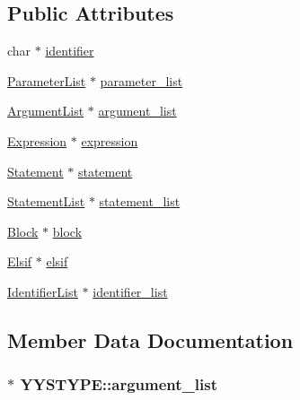 \subsection*{Public Attributes}
\begin{DoxyCompactItemize}
\item 
char $\ast$ \hyperlink{union_y_y_s_t_y_p_e_a90664571e9d5d6cabe4c478b7282b49a}{identifier}
\item 
\hyperlink{crowbar_8h_a7e7687e26b28e339ebcc8eaab571dcf7}{Parameter\+List} $\ast$ \hyperlink{union_y_y_s_t_y_p_e_afd386339b68e2828f86d0c0df7f20d5c}{parameter\+\_\+list}
\item 
\hyperlink{crowbar_8h_ad4ba12ca8ae3ead90081fb0aba63aff3}{Argument\+List} $\ast$ \hyperlink{union_y_y_s_t_y_p_e_a51ceba86a35a20a87f6e0989caf5e277}{argument\+\_\+list}
\item 
\hyperlink{crowbar_8h_a070c6feb370aad8a9665ca315bf6ed4a}{Expression} $\ast$ \hyperlink{union_y_y_s_t_y_p_e_a8be246867e8d03ea7dbd52816e021488}{expression}
\item 
\hyperlink{crowbar_8h_a16fe74a7a87df7652e815d139b3349d2}{Statement} $\ast$ \hyperlink{union_y_y_s_t_y_p_e_a3a91e31e5e63f3d04553e8c84a03a439}{statement}
\item 
\hyperlink{crowbar_8h_a8bffae51ec8146f480c3c14c61b4ff93}{Statement\+List} $\ast$ \hyperlink{union_y_y_s_t_y_p_e_a9ee5746ab7ab41340e386cf1b205c6a5}{statement\+\_\+list}
\item 
\hyperlink{struct_block}{Block} $\ast$ \hyperlink{union_y_y_s_t_y_p_e_a00c5fa03d994f87aa828a8000f2235e9}{block}
\item 
\hyperlink{crowbar_8h_a8d2ba32155a8a8a5a87e93c564061f1d}{Elsif} $\ast$ \hyperlink{union_y_y_s_t_y_p_e_a2b3478770181e47780aa7429d34c347a}{elsif}
\item 
\hyperlink{crowbar_8h_a3e8fd423ff4b73a7c5d557375f0a8741}{Identifier\+List} $\ast$ \hyperlink{union_y_y_s_t_y_p_e_a414528d10ba6151f9db97e991bf08ff0}{identifier\+\_\+list}
\end{DoxyCompactItemize}


\subsection{Member Data Documentation}
\hypertarget{union_y_y_s_t_y_p_e_a51ceba86a35a20a87f6e0989caf5e277}{}
\subsubsection[{argument\+\_\+list}]{ $\ast$ Y\+Y\+S\+T\+Y\+P\+E\+::argument\+\_\+list}\label{union_y_y_s_t_y_p_e_a51ceba86a35a20a87f6e0989caf5e277}
\hypertarget{union_y_y_s_t_y_p_e_a00c5fa03d994f87aa828a8000f2235e9}{}
